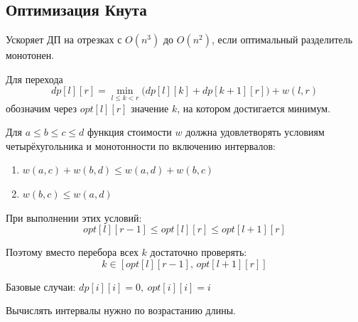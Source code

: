 \subsection{Оптимизация Кнута}

Ускоряет ДП на отрезках с $O(n^3)$ до $O(n^2)$, если оптимальный разделитель монотонен.

Для перехода
\[
dp[l][r] = \min_{l \le k < r}
\bigl(dp[l][k] + dp[k+1][r]\bigr) + w(l,r)
\]
обозначим через $opt[l][r]$ значение $k$, на котором достигается минимум.

Для $a \le b \le c \le d$ функция стоимости $w$ должна удовлетворять условиям четырёхугольника и монотонности по включению интервалов:
\begin{enumerate}
    \item $w(a,c)+w(b,d) \le w(a,d)+w(b,c)$
    \item $w(b,c) \le w(a,d)$
\end{enumerate}

При выполнении этих условий:
\[
opt[l][r-1] \le opt[l][r] \le opt[l+1][r]
\]

Поэтому вместо перебора всех $k$ достаточно проверять:
\[
k \in [opt[l][r-1],\,opt[l+1][r]]
\]

Базовые случаи: $dp[i][i]=0,\ opt[i][i]=i$

Вычислять интервалы нужно по возрастанию длины.